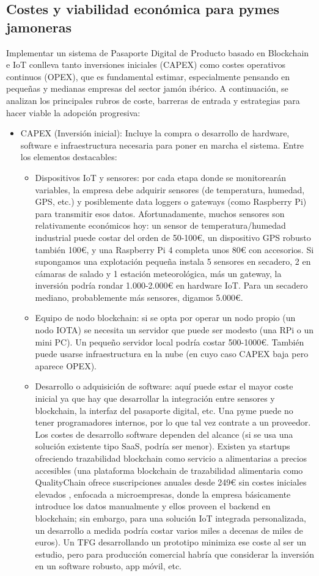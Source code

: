 \subsection{Costes y viabilidad económica para pymes jamoneras}
Implementar un sistema de Pasaporte Digital de Producto basado en Blockchain e IoT conlleva tanto inversiones iniciales (CAPEX) como costes operativos continuos (OPEX), que es fundamental estimar, especialmente pensando en pequeñas y medianas empresas del sector jamón ibérico. A continuación, se analizan los principales rubros de coste, barreras de entrada y estrategias para hacer viable la adopción progresiva:
\begin{itemize}
	\item CAPEX (Inversión inicial): Incluye la compra o desarrollo de hardware, software e infraestructura necesaria para poner en marcha el sistema. Entre los elementos destacables:
    \begin{itemize}
        \item Dispositivos IoT y sensores: por cada etapa donde se monitorearán variables, la empresa debe adquirir sensores (de temperatura, humedad, GPS, etc.) y posiblemente data loggers o gateways (como Raspberry Pi) para transmitir esos datos. Afortunadamente, muchos sensores son relativamente económicos hoy: un sensor de temperatura/humedad industrial puede costar del orden de 50-100€, un dispositivo GPS robusto también 100€, y una Raspberry Pi 4 completa unos 80€ con accesorios. Si supongamos una explotación pequeña instala 5 sensores en secadero, 2 en cámaras de salado y 1 estación meteorológica, más un gateway, la inversión podría rondar 1.000-2.000€ en hardware IoT. Para un secadero mediano, probablemente más sensores, digamos 5.000€.
        \item Equipo de nodo blockchain: si se opta por operar un nodo propio (un nodo IOTA) se necesita un servidor que puede ser modesto (una RPi o un mini PC). Un pequeño servidor local podría costar 500-1000€. También puede usarse infraestructura en la nube (en cuyo caso CAPEX baja pero aparece OPEX).
        \item Desarrollo o adquisición de software: aquí puede estar el mayor coste inicial ya que hay que desarrollar la integración entre sensores y blockchain, la interfaz del pasaporte digital, etc. Una pyme puede no tener programadores internos, por lo que tal vez contrate a un proveedor. Los costes de desarrollo software dependen del alcance (si se usa una solución existente tipo SaaS, podría ser menor). Existen ya startups ofreciendo trazabilidad blockchain como servicio a alimentarias a precios accesibles (una plataforma blockchain de trazabilidad alimentaria como QualityChain ofrece suscripciones anuales desde 249€ sin costes iniciales elevados \cite{salaris_trazabilidad_2020}, enfocada a microempresas, donde la empresa básicamente introduce los datos manualmente y ellos proveen el backend en blockchain; sin embargo, para una solución IoT integrada personalizada, un desarrollo a medida podría costar varios miles a decenas de miles de euros). Un TFG desarrollando un prototipo minimiza ese coste al ser un estudio, pero para producción comercial habría que considerar la inversión en un software robusto, app móvil, etc.

\end{itemize}
\end{itemize}

